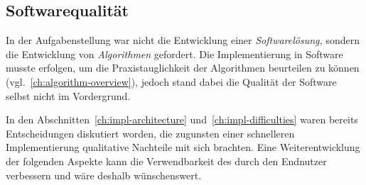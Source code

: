 \documentclass[../main/thesis.tex]{subfiles}
\begin{document}



\subsection{Softwarequalität}
\label{ch:improvements-software}

In der Aufgabenstellung war nicht die Entwicklung einer \emph{Softwarelösung,} sondern die Entwicklung von \emph{Algorithmen} gefordert.
Die Implementierung in Software musste erfolgen, um die Praxistauglichkeit der Algorithmen beurteilen zu können (vgl.~\ref{ch:algorithm-overview}), jedoch stand dabei die Qualität der Software selbst nicht im Vordergrund.

In den Abschnitten~\ref{ch:impl-architecture} und~\ref{ch:impl-difficulties} waren bereits Entscheidungen diskutiert worden, die zugunsten einer schnelleren Implementierung qualitative Nachteile mit sich brachten.
Eine Weiterentwicklung der folgenden Aspekte kann die Verwendbarkeit des  durch den Endnutzer verbessern und wäre deshalb wünschenswert.
%
\end{document}
